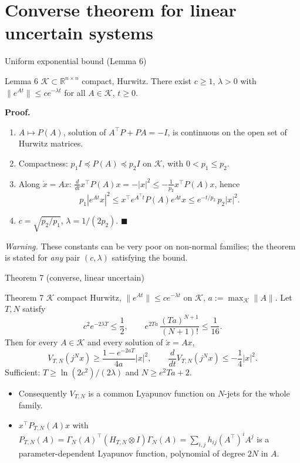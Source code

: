 \documentclass[10pt,aspectratio=169]{beamer}
\newcommand{\R}{\mathbb{R}}
\newcommand{\tr}{^{\top}}
\newcommand{\KK}{\mathcal{K}}
\begin{document}
\section{Converse theorem for linear uncertain systems}

\begin{frame}{Uniform exponential bound (Lemma 6)}
\begin{block}{Lemma 6}
$\KK\subset\R^{n\times n}$ compact, Hurwitz. There exist $c\ge1$, $\lambda>0$ with $\|e^{At}\|\le ce^{-\lambda t}$ for all $A\in\KK$, $t\ge0$.
\end{block}
\textbf{Proof.}
\begin{enumerate}
\item $A\mapsto P(A)$, solution of $A\tr P+PA=-I$, is continuous on the open set of Hurwitz matrices.
\item Compactness: $p_1I\preceq P(A)\preceq p_2I$ on $\KK$, with $0<p_1\le p_2$.
\item Along $\dot x=Ax$: $\frac{d}{dt}x\tr P(A)x=-|x|^2\le-\frac1{p_2}x\tr P(A)x$, hence
\[
p_1|e^{At}x|^2\le x\tr e^{A\tr t}P(A)e^{At}x\le e^{-t/p_2}\,p_2|x|^2 .
\]
\item $c=\sqrt{p_2/p_1}$, $\lambda=1/(2p_2)$. $\blacksquare$
\end{enumerate}
\medskip
\emph{Warning.} These constants can be very poor on non-normal families; the theorem is stated for \emph{any} pair $(c,\lambda)$ satisfying the bound.
\end{frame}

\begin{frame}{Theorem 7 (converse, linear uncertain)}
\begin{block}{Theorem 7}
$\KK$ compact Hurwitz, $\|e^{At}\|\le ce^{-\lambda t}$ on $\KK$, $a:=\max_{\KK}\|A\|$. Let $T,N$ satisfy
\[
c^2e^{-2\lambda T}\le\frac12,\qquad e^{2Ta}\,\frac{(Ta)^{N+1}}{(N+1)!}\le\frac1{16}.
\]
Then for every $A\in\KK$ and every solution of $\dot x=Ax$,
\[
V_{T,N}(j^Nx)\ge\frac{1-e^{-2aT}}{4a}|x|^2,\qquad\frac{d}{dt}V_{T,N}(j^Nx)\le-\frac14|x|^2 .
\]
Sufficient: $T\ge\ln(2c^2)/(2\lambda)$ and $N\ge e^2Ta+2$.
\end{block}
\begin{itemize}
\item Consequently $V_{T,N}$ is a \alert{common} Lyapunov function on $N$-jets for the whole family.
\item $x\tr P_{T,N}(A)x$ with $P_{T,N}(A)=\Gamma_N(A)\tr(H_{T,N}\otimes I)\Gamma_N(A)=\sum_{i,j}h_{ij}(A\tr)^iA^j$ is a parameter-dependent Lyapunov function, polynomial of degree $2N$ in $A$.
\end{itemize}
\end{frame}
\end{document}
